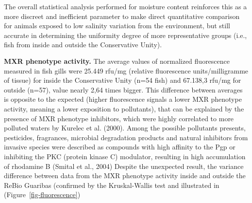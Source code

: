 \documentclass[
  american,
  letterpaper,
  DIV=11,
  numbers=noendperiod]{scrartcl}
\newenvironment{Shaded}{}{}
\newcommand{\AttributeTok}[1]{\textcolor[rgb]{0.49,0.56,0.16}{#1}}
\newcommand{\DecValTok}[1]{\textcolor[rgb]{0.25,0.63,0.44}{#1}}
\newcommand{\FloatTok}[1]{\textcolor[rgb]{0.25,0.63,0.44}{#1}}
\newcommand{\FunctionTok}[1]{\textcolor[rgb]{0.02,0.16,0.49}{#1}}
\newcommand{\NormalTok}[1]{#1}
\newcommand{\SpecialCharTok}[1]{\textcolor[rgb]{0.25,0.44,0.63}{#1}}
\newcommand{\StringTok}[1]{\textcolor[rgb]{0.25,0.44,0.63}{#1}}
\begin{document}
\begin{Shaded}
\end{Shaded}

The overall statistical analysis performed for moisture content
reinforces this as a more discreet and inefficient parameter to make
direct quantitative comparison for animals exposed to low salinity
variation from the environment, but still accurate in determining the
uniformity degree of more representative groups (i.e., fish from inside
and outside the Conservative Unity).

\textbf{MXR phenotype activity.} The average values of normalized
fluorescence measured in fish gills were 25.449 rfu/mg (relative
fluorescence units/milligramme of tissue) for inside the Conservative
Unity (n=54 fish) and 67.138,3 rfu/mg for outside (n=57), value nearly
2,64 times bigger. This difference between averages is opposite to the
expected (higher fluorescence signals a lower MXR phenotype activity,
meaning a lower exposition to pollutants), that can be explained by the
presence of MXR phenotype inhibitors, which were highly correlated to
more polluted waters by Kurelec et al. (2000). Among the possible
pollutants presents, pesticides, fragrances, microbial degradation
products and natural inhibitors from invasive species were described as
compounds with high affinity to the Pgp or inhibiting the PKC (protein
kinase C) modulator, resulting in high accumulation of rhodamine B
(Smital et al., 2004) Despite the unexpected result, the variance
difference between data from the MXR phenotype activity inside and
outside the ReBio Guaribas (confirmed by the Kruskal-Wallis test and
illustrated in (Figure~\ref{fig-fluorescence})
\end{document}
